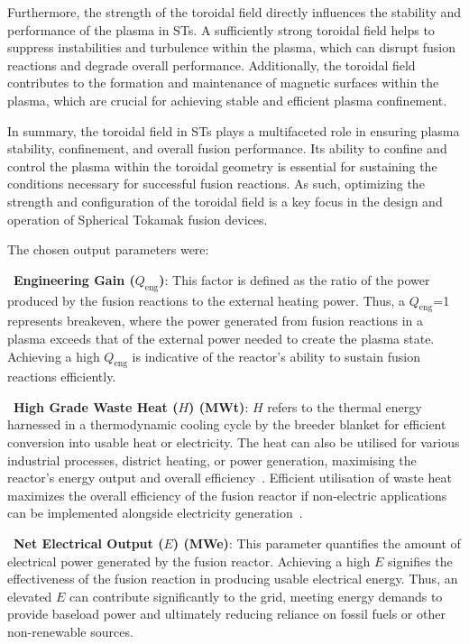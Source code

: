 \documentclass[journal]{IEEEtran}
\begin{document}
Furthermore, the strength of the toroidal field directly influences the stability and performance of the plasma in STs. A sufficiently strong toroidal field helps to suppress instabilities and turbulence within the plasma, which can disrupt fusion reactions and degrade overall performance. Additionally, the toroidal field contributes to the formation and maintenance of magnetic surfaces within the plasma, which are crucial for achieving stable and efficient plasma confinement.

In summary, the toroidal field in STs plays a multifaceted role in ensuring plasma stability, confinement, and overall fusion performance. Its ability to confine and control the plasma within the toroidal geometry is essential for sustaining the conditions necessary for successful fusion reactions. As such, optimizing the strength and configuration of the toroidal field is a key focus in the design and operation of Spherical Tokamak fusion devices.

The chosen output parameters were:

~\textbf{Engineering Gain ($Q_{\text{eng}}$)}: This factor is defined as the ratio of the power produced by the fusion reactions to the external heating power. Thus, a $Q_{\text{eng}}$=1 represents breakeven, where the power generated from fusion reactions in a plasma exceeds that of the external power needed to create the plasma state. Achieving a high $Q_{\text{eng}}$ is indicative of the reactor's ability to sustain fusion reactions efficiently.

~\textbf{High Grade Waste Heat ($H$) (MWt)}: $H$ refers to the thermal energy harnessed in a thermodynamic cooling cycle by the breeder blanket for efficient conversion into usable heat or electricity. The heat can also be utilised for various industrial processes, district heating, or power generation, maximising the reactor's energy output and overall efficiency~\cite{Griffiths2022}. Efficient utilisation of waste heat maximizes the overall efficiency of the fusion reactor if non-electric applications can be implemented alongside electricity generation~\cite{Hidalgo-Salaverri2023}.

~\textbf{Net Electrical Output ($E$) (MWe)}: This parameter quantifies the amount of electrical power generated by the fusion reactor. Achieving a high $E$ signifies the effectiveness of the fusion reaction in producing usable electrical energy. Thus, an elevated $E$ can contribute significantly to the grid, meeting energy demands to provide baseload power and ultimately reducing reliance on fossil fuels or other non-renewable sources. 
\end{document}
